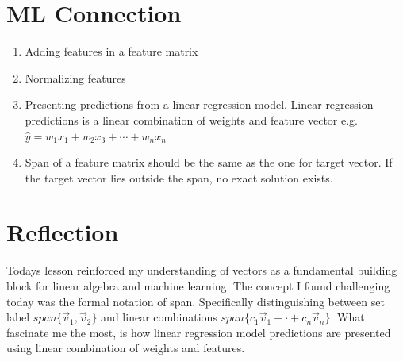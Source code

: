 \documentclass[11pt]{article}
\begin{document}
	\section{ML Connection}
	\begin{enumerate}
		\item Adding features in a feature matrix 
		\item Normalizing features
		\item Presenting predictions from a linear regression model. Linear regression predictions is a linear combination of weights and feature vector e.g. $\hat y = w_1 x_1 + w_2 x_3 + \cdots + w_nx_n$
		\item Span of a feature matrix should be the same as the one for target vector. If the target vector lies outside the span, no exact solution exists.
	\end{enumerate}
	
	
	\section{Reflection}
Todays lesson reinforced my understanding of vectors as a fundamental building block for linear algebra and machine learning.  The concept I found challenging today was the formal notation of span. Specifically distinguishing between set label $span\{\vec v_1, \vec v_2\}$ and linear combinations $span\{c_1\vec v_1 + \cdot + c_n\vec v_n\}$. What fascinate me the most, is how linear regression model predictions are presented using linear combination of weights and features.
\end{document}
